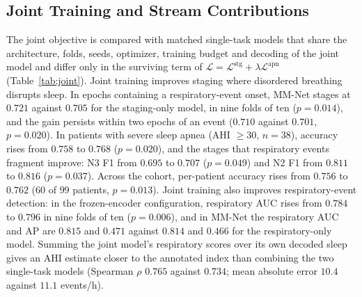 \documentclass[a4paper,fleqn]{cas-sc}
\begin{document}
\subsection{Joint Training and Stream Contributions}
\label{sec:joint}
The joint objective is compared with matched single-task models that share the architecture,
folds, seeds, optimizer, training budget and decoding of the joint model and differ only in the
surviving term of $\mathcal{L}=\mathcal{L}^{\mathrm{stg}}+\lambda\mathcal{L}^{\mathrm{apn}}$
(Table~\ref{tab:joint}). Joint training improves staging where disordered breathing disrupts
sleep. In epochs containing a respiratory-event onset, MM-Net stages at $0.721$ against $0.705$
for the staging-only model, in nine folds of ten ($p=0.014$), and the gain persists within two
epochs of an event ($0.710$ against $0.701$, $p=0.020$). In patients with severe sleep apnea
(AHI $\geq30$, $n=38$), accuracy rises from $0.758$ to $0.768$ ($p=0.020$), and the stages
that respiratory events fragment improve: N3 F1 from $0.695$ to $0.707$ ($p=0.049$) and N2 F1
from $0.811$ to $0.816$ ($p=0.037$). Across the cohort, per-patient accuracy rises from $0.756$
to $0.762$ ($60$ of $99$ patients, $p=0.013$). Joint training also improves respiratory-event
detection: in the frozen-encoder configuration, respiratory AUC rises from $0.784$ to $0.796$ in
nine folds of ten ($p=0.006$), and in MM-Net the respiratory AUC and AP are $0.815$ and $0.471$
against $0.814$ and $0.466$ for the respiratory-only model. Summing the joint model's respiratory
scores over its own decoded sleep gives an AHI estimate closer to the annotated index than
combining the two single-task models (Spearman $\rho$ $0.765$ against $0.734$; mean absolute
error $10.4$ against $11.1$ events/h).
\end{document}
